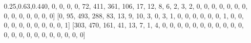 \documentclass[
]{article}
\newenvironment{Shaded}{}{}
\newcommand{\DecValTok}[1]{\textcolor[rgb]{0.25,0.63,0.44}{#1}}
\newcommand{\NormalTok}[1]{#1}
\begin{document}
\begin{Shaded}
\begin{Highlighting}[]
\NormalTok{[}\DecValTok{0}\NormalTok{, }\DecValTok{0}\NormalTok{, }\DecValTok{0}\NormalTok{, }\DecValTok{0}\NormalTok{, }\DecValTok{0}\NormalTok{, }\DecValTok{72}\NormalTok{, }\DecValTok{411}\NormalTok{, }\DecValTok{361}\NormalTok{, }\DecValTok{106}\NormalTok{, }\DecValTok{17}\NormalTok{, }\DecValTok{12}\NormalTok{, }\DecValTok{8}\NormalTok{, }\DecValTok{6}\NormalTok{, }\DecValTok{2}\NormalTok{, }\DecValTok{3}\NormalTok{, }\DecValTok{2}\NormalTok{, }
\DecValTok{0}\NormalTok{, }\DecValTok{0}\NormalTok{, }\DecValTok{0}\NormalTok{, }\DecValTok{0}\NormalTok{, }\DecValTok{0}\NormalTok{, }\DecValTok{0}\NormalTok{, }\DecValTok{0}\NormalTok{, }\DecValTok{0}\NormalTok{, }\DecValTok{0}\NormalTok{, }\DecValTok{0}\NormalTok{, }\DecValTok{0}\NormalTok{, }\DecValTok{0}\NormalTok{, }\DecValTok{0}\NormalTok{, }\DecValTok{0}\NormalTok{]}
\NormalTok{[}\DecValTok{0}\NormalTok{, }\DecValTok{95}\NormalTok{, }\DecValTok{493}\NormalTok{, }\DecValTok{288}\NormalTok{, }\DecValTok{83}\NormalTok{, }\DecValTok{13}\NormalTok{, }\DecValTok{9}\NormalTok{, }\DecValTok{10}\NormalTok{, }\DecValTok{3}\NormalTok{, }\DecValTok{0}\NormalTok{, }\DecValTok{3}\NormalTok{, }\DecValTok{1}\NormalTok{, }\DecValTok{0}\NormalTok{, }\DecValTok{0}\NormalTok{, }\DecValTok{0}\NormalTok{, }\DecValTok{0}\NormalTok{, }
\DecValTok{0}\NormalTok{, }\DecValTok{0}\NormalTok{, }\DecValTok{1}\NormalTok{, }\DecValTok{0}\NormalTok{, }\DecValTok{0}\NormalTok{, }\DecValTok{0}\NormalTok{, }\DecValTok{0}\NormalTok{, }\DecValTok{0}\NormalTok{, }\DecValTok{0}\NormalTok{, }\DecValTok{0}\NormalTok{, }\DecValTok{0}\NormalTok{, }\DecValTok{0}\NormalTok{, }\DecValTok{0}\NormalTok{, }\DecValTok{1}\NormalTok{]}
\NormalTok{[}\DecValTok{303}\NormalTok{, }\DecValTok{470}\NormalTok{, }\DecValTok{161}\NormalTok{, }\DecValTok{41}\NormalTok{, }\DecValTok{13}\NormalTok{, }\DecValTok{7}\NormalTok{, }\DecValTok{1}\NormalTok{, }\DecValTok{4}\NormalTok{, }\DecValTok{0}\NormalTok{, }\DecValTok{0}\NormalTok{, }\DecValTok{0}\NormalTok{, }\DecValTok{0}\NormalTok{, }\DecValTok{0}\NormalTok{, }\DecValTok{0}\NormalTok{, }\DecValTok{0}\NormalTok{, }\DecValTok{0}\NormalTok{, }
\DecValTok{0}\NormalTok{, }\DecValTok{0}\NormalTok{, }\DecValTok{0}\NormalTok{, }\DecValTok{0}\NormalTok{, }\DecValTok{0}\NormalTok{, }\DecValTok{0}\NormalTok{, }\DecValTok{0}\NormalTok{, }\DecValTok{0}\NormalTok{, }\DecValTok{0}\NormalTok{, }\DecValTok{0}\NormalTok{, }\DecValTok{0}\NormalTok{, }\DecValTok{0}\NormalTok{, }\DecValTok{0}\NormalTok{, }\DecValTok{0}\NormalTok{]}
\end{Highlighting}
\end{Shaded}
\end{document}
